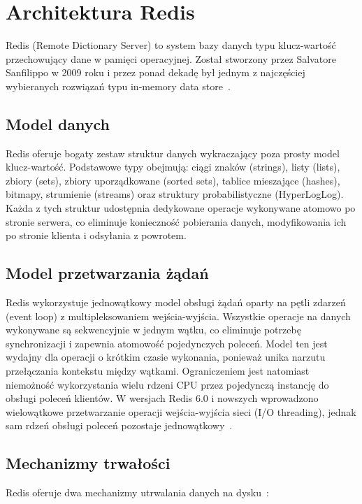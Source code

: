 \section{Architektura Redis}

Redis (Remote Dictionary Server) to system bazy danych typu klucz-wartość przechowujący dane w pamięci operacyjnej. Został stworzony przez Salvatore Sanfilippo w 2009 roku i przez ponad dekadę był jednym z najczęściej wybieranych rozwiązań typu in-memory data store~\cite{redisDocumentation}.

\subsection{Model danych}

Redis oferuje bogaty zestaw struktur danych wykraczający poza prosty model klucz-wartość. Podstawowe typy obejmują: ciągi znaków (strings), listy (lists), zbiory (sets), zbiory uporządkowane (sorted sets), tablice mieszające (hashes), bitmapy, strumienie (streams) oraz struktury probabilistyczne (HyperLogLog). Każda z tych struktur udostępnia dedykowane operacje wykonywane atomowo po stronie serwera, co eliminuje konieczność pobierania danych, modyfikowania ich po stronie klienta i odsyłania z powrotem.

\subsection{Model przetwarzania żądań}

Redis wykorzystuje jednowątkowy model obsługi żądań oparty na pętli zdarzeń (event loop) z multipleksowaniem wejścia-wyjścia. Wszystkie operacje na danych wykonywane są sekwencyjnie w jednym wątku, co eliminuje potrzebę synchronizacji i zapewnia atomowość pojedynczych poleceń. Model ten jest wydajny dla operacji o krótkim czasie wykonania, ponieważ unika narzutu przełączania kontekstu między wątkami. Ograniczeniem jest natomiast niemożność wykorzystania wielu rdzeni CPU przez pojedynczą instancję do obsługi poleceń klientów. W wersjach Redis 6.0 i nowszych wprowadzono wielowątkowe przetwarzanie operacji wejścia-wyjścia sieci (I/O threading), jednak sam rdzeń obsługi poleceń pozostaje jednowątkowy~\cite{redisDocumentation}.

\subsection{Mechanizmy trwałości}

Redis oferuje dwa mechanizmy utrwalania danych na dysku~\cite{redisPersistence}:


